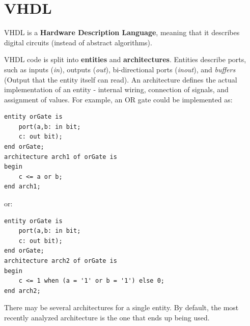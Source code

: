 \documentclass{report}
\newcommand{\tbf}{\textbf}
\newcommand*{\newpar}{\par\vspace{\baselineskip}\noindent} %
\begin{document}
\section{VHDL}
VHDL is a \tbf{Hardware Description Language}, meaning that it describes digital circuits (instead of abstract algorithms).
\newpar
VHDL code is split into \tbf{entities} and \tbf{architectures}. Entities describe ports, such as inputs (\textit{in}), outputs (\textit{out}), bi-directional ports (\textit{inout}), and \textit{buffers} (Output that the entity itself can read). An architecture defines the actual implementation of an entity - internal wiring, connection of signals, and assignment of values. For example, an OR gate could be implemented as:
\begin{verbatim}
entity orGate is
    port(a,b: in bit;
    c: out bit);
end orGate;
architecture arch1 of orGate is
begin
    c <= a or b;
end arch1;
\end{verbatim}
or:
\begin{verbatim}
entity orGate is
    port(a,b: in bit;
    c: out bit);
end orGate;
architecture arch2 of orGate is
begin
    c <= 1 when (a = '1' or b = '1') else 0;
end arch2;
\end{verbatim}
\newpar
There may be several architectures for a single entity. By default, the most recently analyzed architecture is the one that ends up being used.
\end{document}
